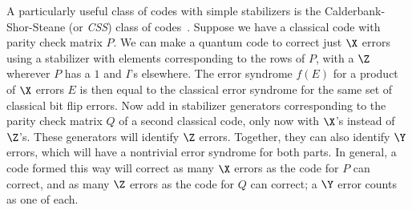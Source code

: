 A particularly useful class of codes with simple stabilizers is the
Calderbank-Shor-Steane (or {\em CSS}) class of
codes~\cite{calderbank-CSS,steane-CSS}.  Suppose we have a classical code
with parity check matrix $P$.  We can make a quantum code to correct just
$\X$ errors using a stabilizer with elements corresponding to the rows of
$P$, with a $\Z$ wherever $P$ has a $1$ and $I$'s elsewhere.  The error
syndrome $f(E)$ for a product of $\X$ errors $E$ is then equal to the
classical error syndrome for the same set of classical bit flip errors.  Now
add in stabilizer generators corresponding to the parity check matrix $Q$
of a second classical code, only now with $\X$'s instead of $\Z$'s.  These
generators will identify $\Z$ errors.  Together, they can also identify $\Y$
errors, which will have a nontrivial error syndrome for both parts.  In
general, a code formed this way will correct as many $\X$ errors as the code
for $P$ can correct, and as many $\Z$ errors as the code for $Q$ can correct;
a $\Y$ error counts as one of each.

